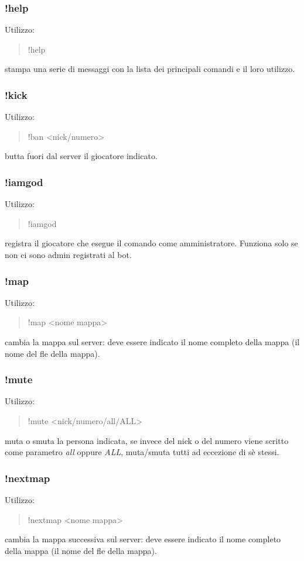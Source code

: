 \documentclass[a4paper]{article}
\begin{document}
\subsubsection{!help}
Utilizzo:
\begin{quote}
!help
\end{quote}
stampa una serie di messaggi con la lista dei principali comandi e il loro utilizzo.

\subsubsection{!kick}
Utilizzo:
\begin{quote}
!ban \textless{}nick/numero\textgreater{}
\end{quote}
butta fuori dal server il giocatore indicato.

\subsubsection{!iamgod}
Utilizzo:
\begin{quote}
!iamgod
\end{quote}
registra il giocatore che esegue il comando come amministratore. Funziona solo se non ci sono admin registrati al bot.

\subsubsection{!map}
Utilizzo:
\begin{quote}
!map \textless{}nome mappa\textgreater{}
\end{quote}
cambia la mappa sul server: deve essere indicato il nome completo della mappa (il nome del fle della mappa).

\subsubsection{!mute}
Utilizzo:
\begin{quote}
!mute \textless{}nick/numero/all/ALL\textgreater{}
\end{quote}
muta o smuta la persona indicata, se invece del nick o del numero viene scritto come parametro \textit{all} oppure \textit{ALL}, muta/smuta tutti ad eccezione di s\`e stessi.

\subsubsection{!nextmap}
Utilizzo:
\begin{quote}
!nextmap \textless{}nome mappa\textgreater{}
\end{quote}
cambia la mappa successiva sul server: deve essere indicato il nome completo della mappa (il nome del fle della mappa).
\end{document}
